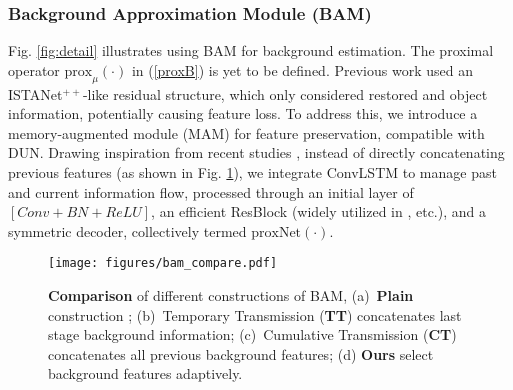 \documentclass[10pt,journal,compsoc]{IEEEtran}
\begin{document}
\subsubsection{Background Approximation Module (BAM)}
Fig. \ref{fig:detail} illustrates using BAM for background estimation. The proximal operator $\text{prox}_\mu(\cdot)$ in (\ref{proxB}) is yet to be defined. Previous work used an ISTANet$^{++}$-like \cite{you-2021-istanetpp} residual structure, which only considered restored and object information, potentially causing feature loss. To address this, we introduce a memory-augmented module (MAM) for feature preservation, compatible with DUN. Drawing inspiration from recent studies \cite{song-2021-madun,song-2023-mapun}, instead of directly concatenating previous features \cite{zhang-2023-ctnet} (as shown in Fig. \ref{fig:bam}), we integrate ConvLSTM \cite{shi-2015-lstm} to manage past and current information flow, processed through an initial layer of $[Conv + BN + ReLU]$, an efficient ResBlock (widely utilized in \cite{zhang-2021-ampnet, wang-2023-indudonet+,mifdal-2023-pan}, etc.), and a symmetric decoder, collectively termed $\text{proxNet}(\cdot)$.
\begin{figure}[t]
\setlength{\abovecaptionskip}{-0.1cm}
\setlength{\belowcaptionskip}{-0.1cm}
    \centering
    \texttt{[image: figures/bam\_compare.pdf]}
    \caption{\textbf{Comparison} of different constructions of BAM, (a)~\textbf{Plain} construction \cite{wu-2024-rpcanet}; (b)~Temporary Transmission (\textbf{TT}) concatenates last stage background information;
 (c)~Cumulative Transmission (\textbf{CT}) \cite{zhang-2023-ctnet} concatenates all previous background features; (d) \textbf{Ours} select background features adaptively.}
    \vspace{-0.4cm}
    \label{fig:bam}
\end{figure}
\end{document}
